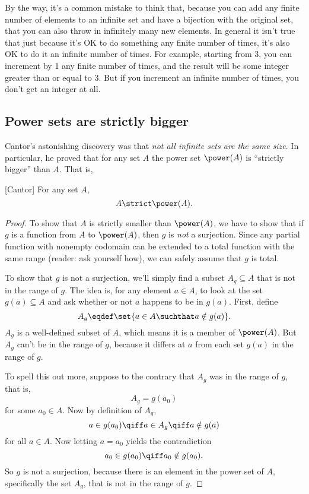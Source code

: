 By the way, it's a common mistake to think that, because you can add
any finite number of elements to an infinite set and have a bijection
with the original set, that you can also throw in infinitely many new
elements.  In general it isn't true that just because it's OK to do
something any finite number of times, it's also OK to do it an infinite
number of times.  For example, starting from 3, you can increment by 1
any finite number of times, and the result will be some integer
greater than or equal to 3.  But if you increment an infinite number
of times, you don't get an integer at all.

\subsection{Power sets are strictly bigger}

Cantor's astonishing discovery was that \emph{not all infinite sets
  are the same size}.  In particular, he proved that for any set $A$
the power set $\power(A)$ is ``strictly bigger'' than
$A$.  That is,
\begin{theorem}\label{powbig}[Cantor]\mbox{}
For any set $A$,
\[
A \strict \power(A).
\]
\end{theorem}
\begin{proof}
\iffalse
  First of all, $\power(A)$ is as big as $A$: for example, the partial
  function $f:\power(A) \to A$, where $f(\set{a}) \eqdef a$ for $a \in
  A$ and $f$ is only defined on one-element sets, is a surjection.
\fi
 
To show that $A$ is strictly smaller than $\power(A)$, we have to show
that if $g$ is a function from $A$ to $\power(A)$, then $g$ is
\emph{not} a surjection.  Since any partial function with nonempty
codomain can be extended to a total function with the same range
(reader: ask yourself how), we can safely assume that $g$ is total.

To show that $g$ is not a surjection, we'll simply find a subset $A_g
\subseteq A$ that is not in the range of $g$.  The idea is, for any
element $a \in A$, to look at the set $g(a) \subseteq A$ and ask
whether or not $a$ happens to be in $g(a)$.  First, define \iffalse
mimicking Russell's Paradox,\fi
  \[
  A_g \eqdef \set{a \in A \suchthat a \notin g(a)}.
  \]
  $A_g$ is a well-defined subset of $A$, which means it is a
  member of $\power(A)$.  But $A_g$ can't be in the range of $g$,
  because it differs at $a$ from each set $g(a)$ in the range of $g$.

  To spell this out more, suppose to the contrary that $A_g$ was in
  the range of $g$, that is,
\[
A_g = g(a_0)
\]
for some $a_0 \in A$.  Now by definition of $A_g$,
\[
a \in g(a_0) \qiff a \in A_g \qiff a \notin g(a)
\]
for all $a \in A$.  Now letting $a = a_0$ yields the contradiction
\[
a_0 \in g(a_0) \qiff a_0 \notin g(a_0).
\]
So $g$ is not a surjection, because there is an element in the power
set of $A$, specifically the set $A_g$, that is not in the range of $g$.
\end{proof}


